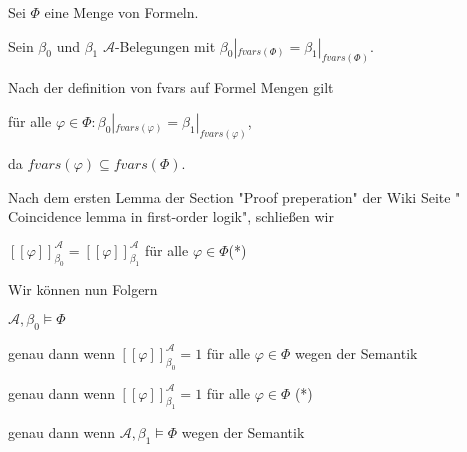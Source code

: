 Sei $\Phi$ eine Menge von Formeln.

Sein $\beta_0$ und $\beta_1$ $\mathcal{A}$-Belegungen mit $\beta_0|_{fvars(\Phi)} = \beta_1|_{fvars(\Phi)}$.

\hfill

Nach der definition von fvars auf Formel Mengen gilt

für alle $\varphi \in \Phi: \beta_0|_{fvars(\varphi)} = \beta_1|_{fvars(\varphi)}$,

da $fvars(\varphi) \subseteq fvars(\Phi)$.

\hfill

Nach dem ersten Lemma der Section "Proof preperation" der Wiki Seite " Coincidence lemma in first-order logik",
schließen wir 

$[\![ \varphi ]\!]_{\beta_0}^\mathcal{A} = [\![ \varphi ]\!]_{\beta_1}^\mathcal{A}$ für alle $\varphi \in \Phi$(*)

Wir können nun Folgern

$\mathcal{A},\beta_0 \vDash \Phi$

genau dann wenn $[\![ \varphi ]\!]_{\beta_0}^\mathcal{A} = 1$ für alle $\varphi \in \Phi$ wegen der Semantik

genau dann wenn $[\![ \varphi ]\!]_{\beta_1}^\mathcal{A} = 1$ für alle $\varphi \in \Phi$ (*)

genau dann wenn $\mathcal{A},\beta_1 \vDash \Phi$ wegen der Semantik

